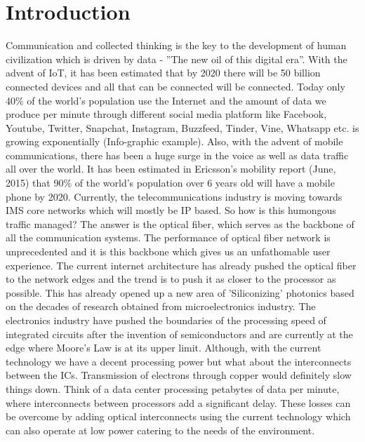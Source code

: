 \documentclass[../main.tex]{subfiles}
\begin{document}
	
	
\chapter{Introduction}
Communication and collected thinking is the key to the development of human civilization which is driven by data - ”The new oil of this digital era”. With the advent of IoT, it has been estimated that by 2020 there will be 50 billion connected devices and all that can be connected will be connected. Today only 40\% of the world’s population use the Internet and the amount of data we produce per minute through different social media platform like Facebook, Youtube, Twitter, Snapchat, Instagram, Buzzfeed, Tinder, Vine, Whatsapp etc. is growing exponentially (Info-graphic example). Also, with the advent of mobile communications, there has been a huge surge in the voice as well as data traffic all over the world. It has been estimated in Ericsson’s mobility report (June, 2015) that 90\% of the world’s population over 6 years old will have a mobile phone by 2020. Currently, the telecommunications industry is moving towards IMS core networks which will mostly be IP based. So how is this humongous traffic managed? The answer is the optical fiber, which serves as the backbone of all the communication systems. The performance of optical fiber network is unprecedented and it is this backbone which gives us an unfathomable user experience. The current internet architecture has already pushed the optical fiber to the network edges and the trend is to push it as closer to the processor as possible. This has already opened up a new area of 'Siliconizing' photonics based on the decades of research obtained from microelectronics industry. The electronics industry have pushed the boundaries of the processing speed of integrated circuits after the invention of semiconductors and are currently at the edge where Moore’s Law is at its upper limit. Although, with the current technology we have a decent processing power but what about the interconnects between the ICs. Transmission of electrons through copper would definitely slow things down. Think of a data center processing petabytes of data per minute, where interconnects between processors add a significant delay. These losses can be overcome by adding optical interconnects using the current technology which can also operate at low power catering to the needs of the environment.  
	
\end{document}
